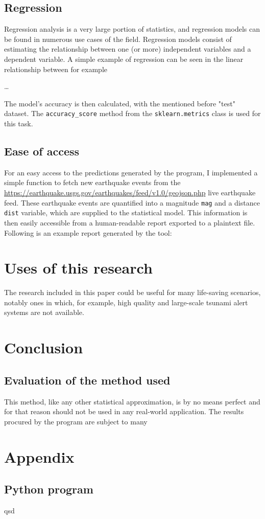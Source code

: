 \documentclass[11pt,letterpaper]{article}
\begin{document}
\subsection{Regression}

Regression analysis is a very large portion of statistics, and regression models can 
be found in numerous use cases of the field. Regression models consist of estimating the 
relationship between one (or more) independent variables and a dependent variable. A 
simple example of regression can be seen in the linear relationship between for example 


\dots

The model's accuracy is then calculated, with the mentioned before "test" dataset. 
The \verb|accuracy_score| method from the \verb|sklearn.metrics| class is used for this 
task. 

\subsection{Ease of access}
For an easy access to the predictions generated by the program, I implemented 
a simple function to fetch new earthquake events from the \url{https://earthquake.usgs.gov/earthquakes/feed/v1.0/geojson.php} 
live earthquake feed. These earthquake events are quantified into a magnitude \verb|mag| 
and a distance \verb|dist| variable, which are supplied to the statistical model. 
This information is then easily accessible from a human-readable report exported 
to a plaintext file. Following is an example report generated by the tool: 

\section{Uses of this research}

The research included in this paper could be useful for many life-saving scenarios, 
notably ones in which, for example, high quality and large-scale tsunami alert 
systems are not available. 

\section{Conclusion}

\subsection{Evaluation of the method used}

This method, like any other statistical approximation, is by no means perfect 
and for that reason should not be used in any real-world application. The results 
procured by the program are subject to many 

\printbibliography[heading=bibintoc, title=Works Cited]

\appendix
\section{Appendix}
\label{app}
\subsection{Python program}
\label{app:scripts}
qsd

\end{document}
